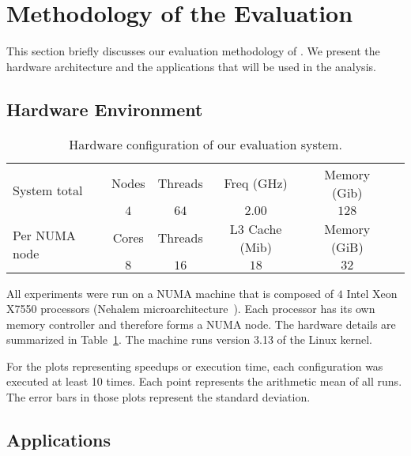 
\section{Methodology of the Evaluation}
\label{sec:metho}

This section briefly discusses our evaluation methodology of \TABARNAC.
We present the hardware architecture and the applications that will be used in the analysis.

\subsection{Hardware Environment}
\label{sec:expe-setup}

\begin{table}[!b]
    \centering
    \caption{Hardware configuration of our evaluation system.}
    \label{tab:turing}
    \footnotesize
        \begin{tabular}{lccccc}
            \toprule
            \multirow{2}{1.5cm}{System total} & Nodes & Threads & Freq (GHz) & Memory (Gib) \\
            \cmidrule(lr){2-5}
                & $4$   & $64$ & $2.00$ & $128$ \\
            \midrule
           \multirow{2}{1.5cm}{\vspace{2mm}Per NUMA node} & Cores & Threads & L3 Cache (Mib) & Memory (GiB) \\
           \cmidrule(lr){2-5}
            & $8$ & $16$ & $18$ & $32$  \\
            \bottomrule
        \end{tabular}

\end{table}

All experiments were run on a NUMA machine that is composed of $4$ Intel Xeon X7550
processors (Nehalem microarchitecture~\cite{Intel2010}). Each processor has its own memory controller and therefore forms a NUMA node. The hardware details are summarized in Table~\ref{tab:turing}.
The machine runs version 3.13 of the Linux kernel.

For the plots representing speedups or execution time, each configuration was executed at least 10 times. Each point represents the arithmetic mean of all runs.
The error bars in those plots represent the standard deviation.

\subsection{Applications}

